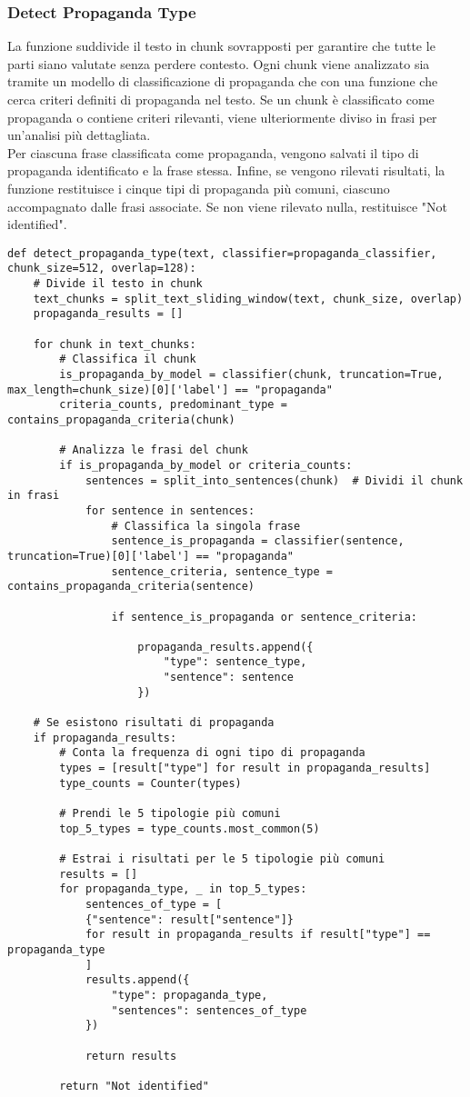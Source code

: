 \documentclass[12pt]{article}
\begin{document}
		\subsubsection{Detect Propaganda Type}
La funzione suddivide il testo in chunk sovrapposti per garantire che tutte le parti siano valutate senza perdere contesto. Ogni chunk viene analizzato sia tramite un modello di classificazione di propaganda che con una funzione che cerca criteri definiti di propaganda nel testo. Se un chunk è classificato come propaganda o contiene criteri rilevanti, viene ulteriormente diviso in frasi per un'analisi più dettagliata.\\
Per ciascuna frase classificata come propaganda, vengono salvati il tipo di propaganda identificato e la frase stessa. Infine, se vengono rilevati risultati, la funzione restituisce i cinque tipi di propaganda più comuni, ciascuno accompagnato dalle frasi associate. Se non viene rilevato nulla, restituisce "Not identified".	
	\begin{lstlisting}
def detect_propaganda_type(text, classifier=propaganda_classifier, chunk_size=512, overlap=128):
	# Divide il testo in chunk
	text_chunks = split_text_sliding_window(text, chunk_size, overlap)
	propaganda_results = []

	for chunk in text_chunks:
		# Classifica il chunk
		is_propaganda_by_model = classifier(chunk, truncation=True, max_length=chunk_size)[0]['label'] == "propaganda"
		criteria_counts, predominant_type = contains_propaganda_criteria(chunk)

		# Analizza le frasi del chunk
		if is_propaganda_by_model or criteria_counts:
			sentences = split_into_sentences(chunk)  # Dividi il chunk in frasi
			for sentence in sentences:
				# Classifica la singola frase
				sentence_is_propaganda = classifier(sentence, truncation=True)[0]['label'] == "propaganda"
				sentence_criteria, sentence_type = contains_propaganda_criteria(sentence)
				
				if sentence_is_propaganda or sentence_criteria:

					propaganda_results.append({
						"type": sentence_type,
						"sentence": sentence
					})

	# Se esistono risultati di propaganda
	if propaganda_results:
		# Conta la frequenza di ogni tipo di propaganda
		types = [result["type"] for result in propaganda_results]
		type_counts = Counter(types)

		# Prendi le 5 tipologie più comuni
		top_5_types = type_counts.most_common(5)

		# Estrai i risultati per le 5 tipologie più comuni
		results = []
		for propaganda_type, _ in top_5_types:
			sentences_of_type = [
			{"sentence": result["sentence"]}
			for result in propaganda_results if result["type"] == propaganda_type
			]
			results.append({
				"type": propaganda_type,
				"sentences": sentences_of_type
			})
			
			return results
			
		return "Not identified"

	\end{lstlisting}
	
\end{document}

